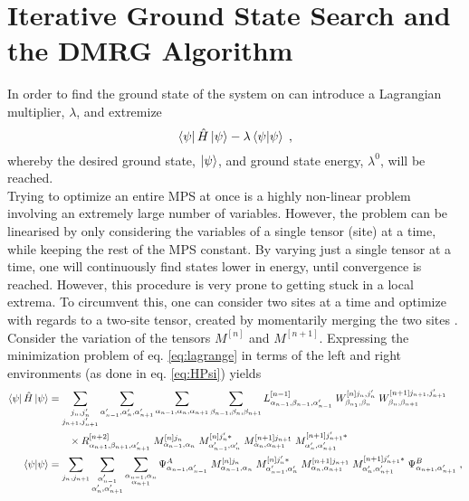 \section{Iterative Ground State Search and the DMRG Algorithm}
In order to find the ground state of the system on can introduce a Lagrangian multiplier, $\lambda$, and extremize
\begin{equation}
	\bra{\psi} \hat{H} \ket{\psi} - \lambda \braket{\psi | \psi} \; ,
	\label{eq:lagrange}
\end{equation}
whereby the desired ground state, $\ket{\psi}$, and ground state energy, $\lambda^0$, will be reached.\\
Trying to optimize an entire MPS at once is a highly non-linear problem involving an extremely large number of variables. However, the problem can be linearised by only considering the variables of a single tensor (site) at a time, while keeping the rest of the MPS constant. By varying just a single tensor at a time, one will continuously find states lower in energy, until convergence is reached. However, this procedure is very prone to getting stuck in a local extrema. To circumvent this, one can consider two sites at a time and optimize with regards to a two-site tensor, created by momentarily merging the two sites \cite{WhiteDMRG}.\\
Consider the variation of the tensors $M^{[n]}$ and $M^{[n+1]}$. Expressing the minimization problem of eq. \eqref{eq:lagrange} in terms of the left and right environments (as done in eq. \eqref{eq:HPsi}) yields
\begin{align}
	\bra{\psi} \hat{H} \ket{\psi} &= \sum_{\substack{j_n , j_n ' \\ j_{n+1} , j_{n+1} '}} \sum_{\alpha_{n-1} ' , \alpha_n ', \alpha_{n+1} '} \sum_{\alpha_{n-1} , \alpha_n , \alpha_{n+1}} \sum_{\beta_{n-1} , \beta_n , \beta_{n+1}} L_{\alpha_{n-1}, \beta_{n-1} , \alpha_{n-1} '}^{[n-1]} \; W_{\beta_{n_1}, \beta_n}^{[n] j_n , j_n '} \; W_{\beta_{n}, \beta_{n+1}}^{[n+1] j_{n+1} , j_{n+1} '} \nonumber \\
	& \qquad \times R_{\alpha_{n+1} ,\beta_{n+1} , \alpha_{n+1} '}^{[n+2]} \; M_{\alpha_{n-1} , \alpha_{n}}^{[n] j_n } \; M_{\alpha_{n-1} ' , \alpha_{n} '}^{[n] j_n ' *} \; M_{\alpha_{n} , \alpha_{n+1}}^{[n+1] j_{n+1} } \; M_{\alpha_{n} ' , \alpha_{n+1} '}^{[n+1] j_{n+1} ' *}  \label{eq:twositeHamil}\\
	\braket{\psi | \psi} &= \sum_{j_n , j_{n+1} } \sum_{\substack{\alpha_{n-1} ' \\ \alpha_n ', \alpha_{n+1} '}} \sum_{\substack{\alpha_{n-1} , \alpha_n \\ \alpha_{n+1}}} \Psi_{\alpha_{n-1},\alpha_{n-1}'}^{A} \; M_{\alpha_{n-1} , \alpha_{n}}^{[n] j_n } \; M_{\alpha_{n-1} ' , \alpha_{n} '}^{[n] j_n ' *} \; M_{\alpha_{n} , \alpha_{n+1}}^{[n+1] j_{n+1} } \; M_{\alpha_{n} ' , \alpha_{n+1} '}^{[n+1] j_{n+1} ' *} \; \Psi_{\alpha_{n+1},\alpha_{n+1}'}^{B} \; , \label{eq:twositeOverlap}
\end{align}
